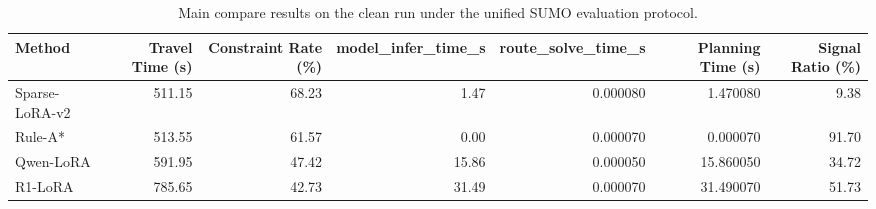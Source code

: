 
\begin{table}[htbp]
\centering
\caption{Main compare results on the clean run under the unified SUMO evaluation protocol.}
\label{tab:main_results}
\small
\begin{tabular}{lrrrrrr}
\hline
Method & Travel Time (s) & Constraint Rate (\%) & model\_infer\_time\_s & route\_solve\_time\_s & Planning Time (s) & Signal Ratio (\%) \\
\hline
Sparse-LoRA-v2 & 511.15 & 68.23 & 1.47 & 0.000080 & 1.470080 & 9.38 \\
Rule-A* & 513.55 & 61.57 & 0.00 & 0.000070 & 0.000070 & 91.70 \\
Qwen-LoRA & 591.95 & 47.42 & 15.86 & 0.000050 & 15.860050 & 34.72 \\
R1-LoRA & 785.65 & 42.73 & 31.49 & 0.000070 & 31.490070 & 51.73 \\
\hline
\end{tabular}
\end{table}


